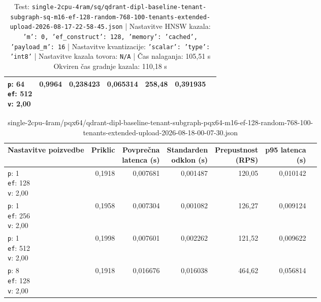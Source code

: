 \begin{table}[htbp]
\begin{tabularx}{\textwidth}{Xrrrrrr}
    \makecell{\texttt{p}: 64\\\texttt{ef}: 512\\\texttt{v}: 2,00} & 0,9964 & 0,238423 & 0,065314 & 258,48 & 0,391935 \\
    \bottomrule
  \end{tabularx}
\caption* {Test: \texttt{single-2cpu-4ram/sq/qdrant-dipl-baseline-tenant-subgraph-sq-m16-ef-128-random-768-100-tenants-extended-upload-2026-08-17-22-58-45.json} | Nastavitve HNSW kazala: \texttt{{'m': 0, 'ef\_construct': 128, 'memory': 'cached', 'payload\_m': 16}} | Nastavitve kvantizacije: \texttt{{'scalar': {'type': 'int8'}}} | Nastavitve kazala tovora: \texttt{N/A} | Čas nalaganja: 105,51 s Okviren čas gradnje kazala: 110,18 s}\end{table}


\begin{table}[htbp]
  \centering
\small
  \caption{single-2cpu-4ram/pqx64/qdrant-dipl-baseline-tenant-subgraph-pqx64-m16-ef-128-random-768-100-tenants-extended-upload-2026-08-18-00-07-30.json}
  \label{tab:single-2cpu-4ram:pqx64:qdrant-dipl-baseline-tenant-subgraph-pqx64-m16-ef-128-random-768-100-tenants-extended-upload-2026-08-18-00-07-30.json}
  \begin{tabularx}{\textwidth}{Xrrrrrr}
    \toprule
    Nastavitve poizvedbe & Priklic & \makecell{Povprečna\\latenca (s)} & \makecell{Standarden\\odklon (s)} & \makecell{Prepustnost\\(RPS)} & \makecell{p95 latenca\\(s)}  \\
    \midrule
    \makecell{\texttt{p}: 1\\\texttt{ef}: 128\\\texttt{v}: 2,00} & 0,1918 & 0,007681 & 0,001487 & 120,05 & 0,010142 \\
    \makecell{\texttt{p}: 1\\\texttt{ef}: 256\\\texttt{v}: 2,00} & 0,1958 & 0,007304 & 0,001082 & 126,27 & 0,009124 \\
    \makecell{\texttt{p}: 1\\\texttt{ef}: 512\\\texttt{v}: 2,00} & 0,1998 & 0,007601 & 0,002262 & 121,52 & 0,009622 \\
    \makecell{\texttt{p}: 8\\\texttt{ef}: 128\\\texttt{v}: 2,00} & 0,1918 & 0,016676 & 0,016038 & 464,62 & 0,056814 \\

\end{tabularx}
\end{table}
